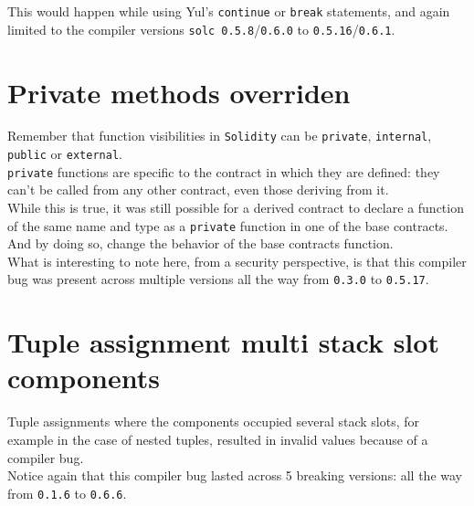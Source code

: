 This would happen while using Yul's \texttt{continue} or \texttt{break} statements, and again limited to the compiler versions \texttt{solc 0.5.8}/\texttt{0.6.0} to \texttt{0.5.16}/\texttt{0.6.1}.

\section{Private methods overriden}
Remember that function visibilities in \texttt{Solidity} can be \texttt{private}, \texttt{internal}, \texttt{public} or \texttt{external}. \\

\texttt{private} functions are specific to the contract in which they are defined: they can't be called from any other contract, even those deriving from it. \\

While this is true, it was still possible for a derived contract to declare a function of the same name and type as a \texttt{private} function in one of the base contracts. And by doing so, change the behavior of the base contracts function.\\

What is interesting to note here, from a security perspective, is that this compiler bug was present across multiple versions all the way from \texttt{0.3.0} to \texttt{0.5.17}.\\


\section{Tuple assignment multi stack slot components}
Tuple assignments where the components occupied several stack slots, for example in the case of nested tuples, resulted in invalid values because of a compiler bug. \\

Notice again that this compiler bug lasted across 5 breaking versions: all the way from \texttt{0.1.6} to \texttt{0.6.6}.

